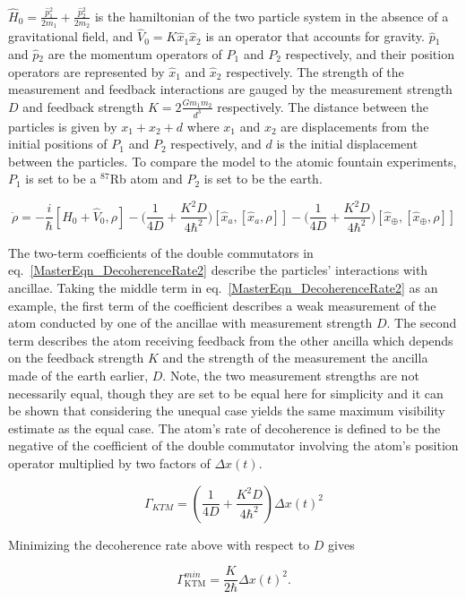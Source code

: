 \documentclass[aps, prd, superscriptaddress,twocolumn,amsmath,amssymb,nofootinbib]{revtex4-1}
\newcommand{\beq}{\begin{equation}}
\newcommand{\eeq}{\end{equation}}
\def\Gktm{\Gamma_{\mathrm{KTM}}}
\newcommand{\h}[1]{\hat#1{}}
\begin{document}
$\h H_0 = \frac{\h p_1^2}{2m_1} + \frac{\h p_2^2}{2m_2}$ is the hamiltonian of the two particle system in the absence of a gravitational field, and $\h V_0 = K\h x_1\h x_2$ is an operator that accounts for gravity. $\h p_1$ and $\h p_2$ are the momentum operators of $P_1$ and $P_2$ respectively, and their position operators are represented by $\h x_1$ and $\h x_2$ respectively. The strength of the measurement and feedback interactions are gauged by the measurement strength $D$ and feedback strength $K = 2\frac{Gm_1m_2}{d^3}$ respectively. The distance between the particles is given by $x_1 + x_2 + d$ where $x_1$ and $x_2$ are displacements from the initial positions of $P_1$ and $P_2$ respectively, and $d$ is the initial displacement between the particles. To compare the model to the atomic fountain experiments, $P_1$ is set to be a $^{87}$Rb atom and $P_2$ is set to be the earth.

\beq
 \dot{\rho} = -\frac{i}{\hbar}[\h H_0+\h V_0, \rho] 
 -\bigg(\frac{1}{4D}+\frac{K^2D}{4\hbar^2}\bigg)[\h x_a, [\h x_a,\rho]]
  -\bigg(\frac{1}{4D}+\frac{K^2D}{4\hbar^2}\bigg)[\h x_\oplus, [\h x_\oplus,\rho]]
 \label{MasterEqn_DecoherenceRate2}
 \eeq

The two-term coefficients of the double commutators in eq.~\eqref{MasterEqn_DecoherenceRate2} describe the particles' interactions with ancillae. Taking the middle term in eq.~\eqref{MasterEqn_DecoherenceRate2} as an example, the first term of the coefficient describes a weak measurement of the atom conducted by one of the ancillae with measurement strength $D$. The second term describes the atom receiving feedback from the other ancilla which depends on the feedback strength $K$ and the strength of the measurement the ancilla made of the earth earlier, $D$. Note, the two measurement strengths are not necessarily equal, though they are set to be equal here for simplicity and it can be shown that considering the unequal case yields the same maximum visibility estimate as the equal case. The atom's rate of decoherence is defined to be the negative of the coefficient of the double commutator involving the atom's position operator multiplied by two factors of $\Delta x(t)$.

\beq
\label{gamma_ktm}
\Gamma_{KTM}=\left(\frac{1}{4D}+\frac{K^2D}{4\hbar^2}\right)\Delta x(t)^2
\eeq

Minimizing the decoherence rate above with respect to $D$ gives

\beq
\label{gamma_ktm_min}
\Gktm^{min}=\frac{K}{2\hbar}\Delta x(t)^2.
\eeq
\end{document}
